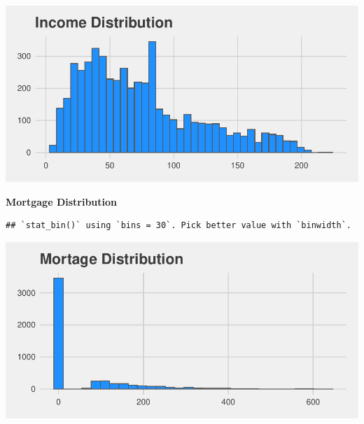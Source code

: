\documentclass[
]{article}
\newenvironment{Shaded}{\begin{snugshade}}{\end{snugshade}}
\newcommand{\CommentTok}[1]{\textcolor[rgb]{0.00,0.40,1.00}{\textbf{\textit{#1}}}}
\newcommand{\DataTypeTok}[1]{\textcolor[rgb]{0.74,0.68,0.62}{\underline{#1}}}
\newcommand{\KeywordTok}[1]{\textcolor[rgb]{0.26,0.66,0.93}{\textbf{#1}}}
\newcommand{\NormalTok}[1]{\textcolor[rgb]{0.74,0.68,0.62}{#1}}
\newcommand{\OperatorTok}[1]{\textcolor[rgb]{0.74,0.68,0.62}{#1}}
\newcommand{\StringTok}[1]{\textcolor[rgb]{0.02,0.61,0.04}{#1}}
\begin{document}
\includegraphics{Bank_Loan_Classification_files/figure-latex/unnamed-chunk-10-1.pdf}

\textbf{Mortgage Distribution}

\begin{Shaded}
\end{Shaded}

\begin{verbatim}
## `stat_bin()` using `bins = 30`. Pick better value with `binwidth`.
\end{verbatim}

\includegraphics{Bank_Loan_Classification_files/figure-latex/unnamed-chunk-11-1.pdf}
\end{document}
